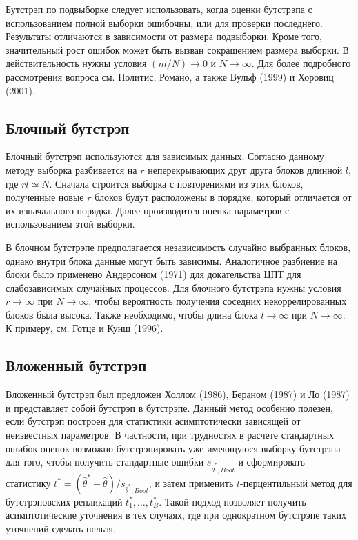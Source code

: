 Бутстрэп по подвыборке следует использовать, когда оценки бутстрэпа с использованием полной выборки ошибочны, или для проверки последнего. Результаты отличаются в зависимости от размера подвыборки. Кроме того, значительный рост ошибок может быть вызван сокращением размера выборки. В действительность нужны условия $(m/N) \rightarrow 0$ и $N{\rightarrow}\infty$. Для более подробного рассмотрения вопроса см. Политис, Романо, а также Вульф (1999) и Хоровиц (2001).

\subsection{Блочный бутстрэп}

Блочный бутстрэп используются для зависимых данных. Согласно данному методу выборка разбивается на $r$ неперекрывающих друг друга блоков длинной $l$, где $rl \simeq N$. Сначала  строится выборка с повторениями из этих блоков, полученные новые $r$ блоков будут расположены в порядке, который отличается от их изначального порядка. Далее производится оценка параметров с использованием  этой выборки. 

В блочном бутстрэпе  предполагается независимость случайно выбранных блоков, однако внутри блока данные могут быть зависимы. Аналогичное разбиение на блоки  было применено Андерсоном (1971) для докательства ЦПТ для слабозависимых случайных процессов. Для блочного бутстрэпа нужны условия $r \rightarrow \infty$ при $N \rightarrow \infty$, чтобы вероятность получения соседних некоррелированных блоков была высока. Также необходимо, чтобы длина блока $l \rightarrow \infty$ при $N \rightarrow \infty$. К примеру, см. Готце и Кунш (1996).

\subsection{Вложенный бутстрэп}

Вложенный бутстрэп был предложен Холлом (1986), Бераном (1987) и Ло (1987) и  представляет собой бутстрэп в бутстрэпе. Данный метод особенно полезен, если бутстрэп построен для статистики асимптотически зависящей от неизвестных параметров.   В частности, при трудностях в расчете стандартных ошибок оценок возможно бутстрэпировать уже имеющуюся выборку бутстрэпа для того, чтобы получить стандартные ошибки $s_{\hat{\theta}^*,Boot}$ и сформировать статистику $t^*=(\hat{\theta}^*-\hat{\theta})/s_{\hat{\theta}^*,Boot}$, и затем применить  $t$-перцентильный метод для бутстрэповских репликаций  $t_1^*,\ldots ,t_B^*$. Такой подход позволяет получить асимптотические уточнения в тех случаях, где при однократном бутстрэпе таких уточнений сделать нельзя.

